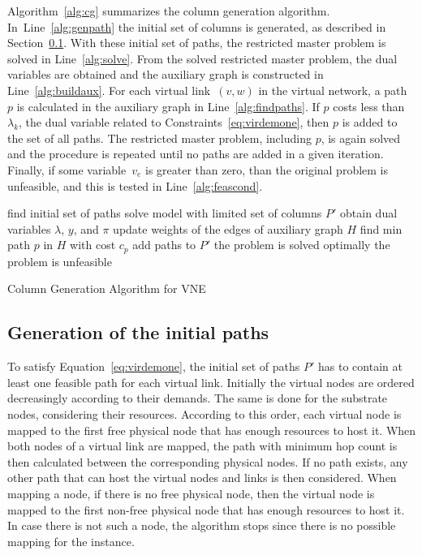 \documentclass[article]{llncs}
\begin{document}
Algorithm~\ref{alg:cg} summarizes the column generation algorithm. In~Line~\ref{alg:genpath} the initial set of columns is generated, as described in Section~\ref{sec:initialCol}. With these initial set of paths, the restricted master problem is solved in Line~\ref{alg:solve}. From the solved restricted master problem, the dual variables are obtained and the auxiliary graph is constructed in Line~\ref{alg:buildaux}. For each virtual link~$(v,w)$ in the virtual network, a path $p$ is calculated in the auxiliary graph in Line~\ref{alg:findpaths}. If $p$ costs less than $\lambda_{k}$, the dual variable related to Constraints~\eqref{eq:virdemone}, then $p$ is added to the set of all paths. The restricted master problem, including $p$, is again solved and the procedure is repeated until no paths are added in a given iteration. 
Finally, if some variable~$v_{e}$ is greater than zero, than the original problem is unfeasible, and this is tested in Line~\ref{alg:feascond}.
\begin{algorithm}
find initial set of paths\; \label{alg:genpath}
  {solve model with limited set of columns $P'$\; \label{alg:solve}
  obtain dual variables $\lambda$, $y$, and $\pi$\; 
  update weights of the edges of auxiliary graph $H$\; \label{alg:buildaux}
    {find min path $p$ in $H$ with cost $c_{p}$\; \label{alg:findpaths}
      {add paths to $P'$\;}
    }
  }
  {the problem is solved optimally\;}
  {the problem is unfeasible\;}
\caption{Column Generation Algorithm for VNE}
\label{alg:cg}
\end{algorithm}

\subsection{Generation of the initial paths}\label{sec:initialCol}
To satisfy Equation~\ref{eq:virdemone}, the initial set of paths $P'$ has to contain at least one feasible path for each virtual link.
Initially the virtual nodes are ordered decreasingly according to their demands. The same is done for the substrate nodes, considering their resources.
According to this order, each virtual node is mapped to the first free physical node that has enough resources to host it.
When both nodes of a virtual link are mapped, the path with minimum hop count is then calculated between the corresponding physical nodes.
If no path exists, any other path that can host the virtual nodes and links is then considered.
When mapping a node, if there is no free physical node, then the virtual node is mapped to the first non-free physical node that has enough resources to host it.
In case there is not such a node, the algorithm stops since there is no possible mapping for the instance.
\end{document}
